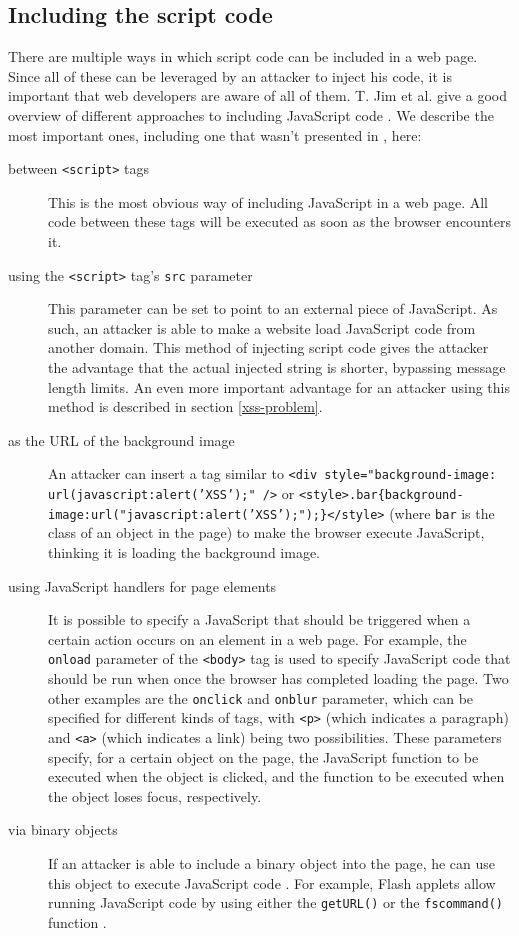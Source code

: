\subsection{Including the script code}\label{injecting-script}
There are multiple ways in which script code can be included in a web page. Since all of these can be leveraged by an attacker to inject his code, it is important that web developers are aware of all of them. T. Jim et al. give a good overview of different approaches to including JavaScript code \cite{Jim2007}. We describe the most important ones, including one that wasn't presented in \cite{Jim2007}, here:
\begin{description}
	\item[between \texttt{<script>} tags] This is the most obvious way of including JavaScript in a web page. All code between these tags will be executed as soon as the browser encounters it.
	\item[using the \texttt{<script>} tag's \texttt{src} parameter] This parameter can be set to point to an external piece of JavaScript. As such, an attacker is able to make a website load JavaScript code from another domain. This method of injecting script code gives the attacker the advantage that the actual injected string is shorter, bypassing message length limits. An even more important advantage for an attacker using this method is described in section \ref{xss-problem}.
	\item[as the URL of the background image] An attacker can insert a tag similar to \texttt{<div style="background-image: url(javascript:alert('XSS');" />} or \texttt{<style>.bar\{background-image:url("javascript:alert('XSS');");\}</style>} (where \texttt{bar} is the class of an object in the page) to make the browser execute JavaScript, thinking it is loading the background image.
	\item[using JavaScript handlers for page elements] It is possible to specify a JavaScript that should be triggered when a certain action occurs on an element in a web page. For example, the \texttt{onload} parameter of the \texttt{<body>} tag is used to specify JavaScript code that should be run when once the browser has completed loading the page. Two other examples are the \texttt{onclick} and \texttt{onblur} parameter, which can be specified for different kinds of tags, with \texttt{<p>} (which indicates a paragraph) and \texttt{<a>} (which indicates a link) being two possibilities. These parameters specify, for a certain object on the page, the JavaScript function to be executed when the object is clicked, and the function to be executed when the object loses focus, respectively.
	\item[via binary objects] If an attacker is able to include a binary object into the page, he can use this object to execute JavaScript code \cite{Bisht2008}. For example, Flash applets allow running JavaScript code by using either the \texttt{getURL()} or the \texttt{fscommand()} function \cite{FlashJSattack,FlashJS,FlashCookie}.
\end{description}

